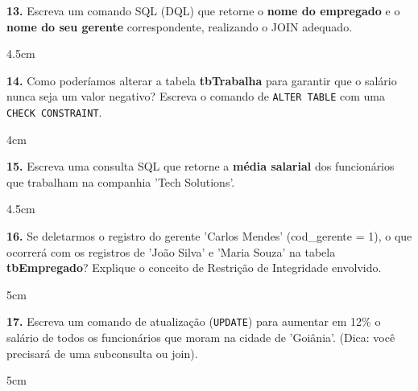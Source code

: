 \documentclass[12pt]{article}
\begin{document}
\vspace{0.5cm}

\textbf{13.} Escreva um comando SQL (DQL) que retorne o \textbf{nome do empregado} e o \textbf{nome do seu gerente} correspondente, realizando o JOIN adequado.
\begin{resposta}{4.5cm}
\end{resposta}

\vspace{0.5cm}

\textbf{14.} Como poderíamos alterar a tabela \textbf{tbTrabalha} para garantir que o salário nunca seja um valor negativo? Escreva o comando de \texttt{ALTER TABLE} com uma \texttt{CHECK CONSTRAINT}.
\begin{resposta}{4cm}
\end{resposta}

\vspace{0.5cm}

\textbf{15.} Escreva uma consulta SQL que retorne a \textbf{média salarial} dos funcionários que trabalham na companhia 'Tech Solutions'.
\begin{resposta}{4.5cm}
\end{resposta}



\textbf{16.} Se deletarmos o registro do gerente 'Carlos Mendes' (cod\_gerente = 1), o que ocorrerá com os registros de 'João Silva' e 'Maria Souza' na tabela \textbf{tbEmpregado}? Explique o conceito de Restrição de Integridade envolvido.
\begin{resposta}{5cm}
\end{resposta}

\vspace{0.5cm}

\textbf{17.} Escreva um comando de atualização (\texttt{UPDATE}) para aumentar em 12\% o salário de todos os funcionários que moram na cidade de 'Goiânia'. (Dica: você precisará de uma subconsulta ou join).
\begin{resposta}{5cm}
\end{resposta}
\end{document}
